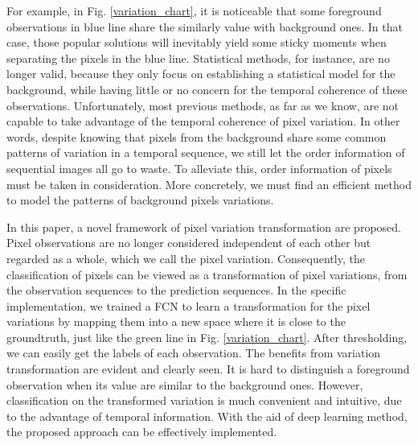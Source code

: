 \documentclass[journal]{IEEEtran}
\newcommand{\reffig}[1]{Fig. \ref{#1}}
\DeclareMathOperator*{\argmin}{argmin}
\begin{document}
For example, in \reffig{variation_chart}, it is noticeable that some foreground observations in blue line share the similarly value with background ones. 
In that case, those popular solutions will inevitably yield some sticky moments when separating the pixels in the blue line. 
Statistical methods, for instance, are no longer valid, because they only focus on establishing a statistical model for the background, while having little or no concern for the temporal coherence of these observations. 
Unfortunately, most previous methods, as far as we know, are not capable to take advantage of the temporal coherence of pixel variation. 
In other words, despite knowing that pixels from the background share some common patterns of variation in a temporal sequence, we still let the order information of sequential images all go to waste. 
To alleviate this, order information of pixels must be taken in consideration. 
More concretely, we must find an efficient method to model the patterns of background pixels variations.


In this paper, a novel framework of pixel variation transformation are proposed. %
Pixel observations are no longer considered independent of each other but regarded as a whole, which we call the pixel variation. 
Consequently, the classification of pixels can be viewed as a transformation of pixel variations, from the observation sequences to the prediction sequences. 
In the specific implementation, we trained a FCN to learn a transformation for the pixel variations by mapping them into a new space where it is close to the groundtruth, just like the green line in \reffig{variation_chart}. 
After thresholding, we can easily get the labels of each observation. 
The benefits from variation transformation are evident and clearly seen. 
It is hard to distinguish a foreground observation when its value are similar to the background ones. 
However, classification on the transformed variation is much convenient and intuitive, due to the advantage of temporal information. 
With the aid of deep learning method, the proposed approach can be effectively implemented.

\end{document}
